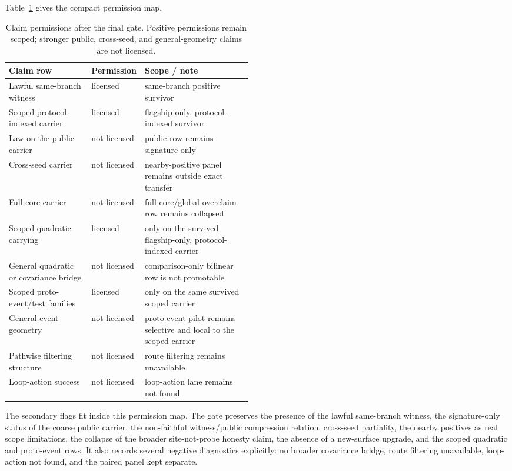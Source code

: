 \documentclass[11pt]{article}
\theoremstyle{definition}
\begin{document}
Table~\ref{tab:claim-permissions} gives the compact permission map.

\begin{table}[t]
\centering
\footnotesize
\caption{Claim permissions after the final gate. Positive permissions remain scoped;
stronger public, cross-seed, and general-geometry claims are not licensed.}
\label{tab:claim-permissions}
\begin{tabularx}{\linewidth}{@{}>{\raggedright\arraybackslash}p{0.34\linewidth}>{\raggedright\arraybackslash}p{0.14\linewidth}>{\raggedright\arraybackslash}X@{}}
\toprule
Claim row & Permission & Scope / note \\
\midrule
Lawful same-branch witness & licensed & same-branch positive survivor \\
Scoped protocol-indexed carrier & licensed & flagship-only, protocol-indexed survivor \\
Law on the public carrier & not licensed & public row remains signature-only \\
Cross-seed carrier & not licensed & nearby-positive panel remains outside exact transfer \\
Full-core carrier & not licensed & full-core/global overclaim row remains collapsed \\
Scoped quadratic carrying & licensed & only on the survived flagship-only, protocol-indexed carrier \\
General quadratic or covariance bridge & not licensed & comparison-only bilinear row is not promotable \\
Scoped proto-event/test families & licensed & only on the same survived scoped carrier \\
General event geometry & not licensed & proto-event pilot remains selective and local to the scoped carrier \\
Pathwise filtering structure & not licensed & route filtering remains unavailable \\
Loop-action success & not licensed & loop-action lane remains not found \\
\bottomrule
\end{tabularx}
\end{table}

The secondary flags fit inside this permission map. The gate preserves the presence
of the lawful same-branch witness, the signature-only status of the coarse public
carrier, the non-faithful witness/public compression relation, cross-seed
partiality, the nearby positives as real scope limitations, the collapse of the
broader site-not-probe honesty claim, the absence of a new-surface upgrade, and the
scoped quadratic and proto-event rows. It also records several negative diagnostics
explicitly: no broader covariance bridge, route filtering unavailable, loop-action not
found, and the paired panel kept separate.
\end{document}
